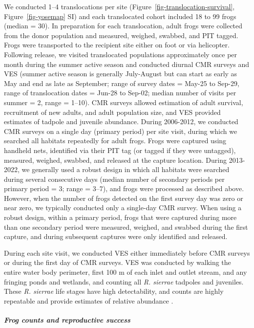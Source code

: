 \documentclass[
  letterpaper,
  DIV=11,
  numbers=noendperiod]{scrartcl}
\let\oldsubparagraph\subparagraph
\renewcommand{\subparagraph}[1]{\oldsubparagraph{#1}\mbox{}}
\begin{document}
We conducted 1--4 translocations per site
(Figure~\ref{fig-translocation-survival}, Figure~\ref{fig-yosemap} SI)
and each translocated cohort included 18 to 99 frogs (median = 30). In
preparation for each translocation, adult frogs were collected from the
donor population and measured, weighed, swabbed, and PIT tagged. Frogs
were transported to the recipient site either on foot or via helicopter.
Following release, we visited translocated populations approximately
once per month during the summer active season and conducted diurnal CMR
surveys and VES (summer active season is generally July-August but can
start as early as May and end as late as September; range of survey
dates = May-25 to Sep-29, range of translocation dates = Jun-28 to
Sep-02; median number of visits per summer = 2, range = 1--10). CMR
surveys allowed estimation of adult survival, recruitment of new adults,
and adult population size, and VES provided estimates of tadpole and
juvenile abundance. During 2006-2012, we conducted CMR surveys on a
single day (primary period) per site visit, during which we searched all
habitats repeatedly for adult frogs. Frogs were captured using handheld
nets, identified via their PIT tag (or tagged if they were untagged),
measured, weighed, swabbed, and released at the capture location. During
2013-2022, we generally used a robust design in which all habitats were
searched during several consecutive days (median number of secondary
periods per primary period = 3; range = 3--7), and frogs were processed
as described above. However, when the number of frogs detected on the
first survey day was zero or near zero, we typically conducted only a
single-day CMR survey. When using a robust design, within a primary
period, frogs that were captured during more than one secondary period
were measured, weighed, and swabbed during the first capture, and during
subsequent captures were only identified and released.

During each site visit, we conducted VES either immediately before CMR
surveys or during the first day of CMR surveys. VES was conducted by
walking the entire water body perimeter, first 100 m of each inlet and
outlet stream, and any fringing ponds and wetlands, and counting all
\emph{R. sierrae} tadpoles and juveniles. These \emph{R. sierrae} life
stages have high detectability, and counts are highly repeatable and
provide estimates of relative abundance \citep{knapp2000}.

\hypertarget{frog-counts-and-reproductive-success}{%
\subparagraph{Frog counts and reproductive
success}\label{frog-counts-and-reproductive-success}}
\end{document}
